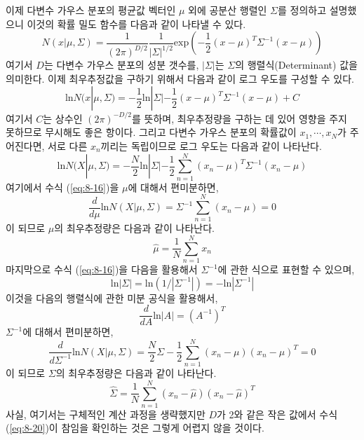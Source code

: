 \documentclass[a4paper]{oblivoir}
\begin{document}
이제 다변수 가우스 분포의 평균값 벡터인 $ {\mu}$ 외에 공분산 행렬인 ${\Sigma}$를 정의하고 설명했으니 이것의 확률 밀도 함수를 다음과 같이 나타낼 수 있다. 
\begin{equation}
N( {x}| {\mu},  {\Sigma}) = \frac{1}{(2 \pi)^{D/2}} \frac{1}{| {\Sigma}|^{1/2}} \textrm{exp}(-\frac{1}{2} ( {x}- {\mu})^{T}  {\Sigma}^{-1} ( {x}- {\mu})) \label{eq:8-14} 
\end{equation}
여기서 $D$는 다변수 가우스 분포의 성분 갯수를, $| {\Sigma}|$는 $ {\Sigma}$의 행렬식(Determinant) 값을 의미한다. 이제 최우추정값을 구하기 위해서 다음과 같이 로그 우도를 구성할 수 있다. 
\begin{equation}
\textrm{ln} N( {x}| {\mu},  {\Sigma}) = -\frac{1}{2} \textrm{ln}| {\Sigma}| -\frac{1}{2} ( {x}- {\mu})^{T}  {\Sigma}^{-1} ( {x}- {\mu}) +  {C} \label{eq:8-15} 
\end{equation}
여기서 $ {C}$는 상수인 $(2 \pi)^{-D/2}$를 뜻하며, 최우추정량을 구하는 데 있어 영향을 주지 못하므로 무시해도 좋은 항이다. 그리고 다변수 가우스 분포의 확률값이 $ {x}_1,\cdots, {x}_N$가 주어진다면, 서로 다른 $ {x}_n$끼리는 독립이므로 로그 우도는 다음과 같이 나타난다. 
\begin{equation}
\textrm{ln} N( {X}| {\mu},  {\Sigma}) = -\frac{N}{2} \textrm{ln}| {\Sigma}| - \frac{1}{2} \sum_{n=1}^{N} ( {x}_n- {\mu})^{T}  {\Sigma}^{-1} ( {x}_n- {\mu}) \label{eq:8-16} 
\end{equation}
여기에서 수식 (\ref{eq:8-16})을 $ {\mu}$에 대해서 편미분하면, 
\begin{equation}
\frac{d}{d {\mu}} \textrm{ln} N( {X}| {\mu},  {\Sigma}) =  {\Sigma}^{-1} \sum_{n=1}^{N} ( {x}_n- {\mu}) = 0 \label{eq:8-17} 
\end{equation}
이 되므로 $ {\mu}$의 최우추정량은 다음과 같이 나타난다.
\begin{equation}
\hat{ {\mu}} = \frac{1}{N} \sum_{n=1}^{N}  {x}_{n} \label{eq:8-18} 
\end{equation}
마지막으로 수식 (\ref{eq:8-16})을 다음을 활용해서 ${\Sigma}^{-1}$에 관한 식으로 표현할 수 있으며,
\begin{equation}
\textrm{ln}|{\Sigma}| = \textrm{ln}(1/|{\Sigma}^{-1}|) = -\textrm{ln}|{\Sigma}^{-1}| \label{eq:8-18-1} 
\end{equation}
이것을 다음의 행렬식에 관한 미분 공식을 활용해서,
\begin{equation}
\frac{d}{dA} \textrm{ln}|A| = (A^{-1})^{T} \label{eq:8-18-2} 
\end{equation}
${\Sigma}^{-1}$에 대해서 편미분하면, 
\begin{equation}
\frac{d}{d {\Sigma}^{-1}} \textrm{ln} N( {X}| {\mu},  {\Sigma}) = \frac{N}{2}  {\Sigma} - \frac{1}{2} \sum_{n=1}^{N} ( {x}_n- {\mu})  ( {x}_n- {\mu})^{T} = 0 \label{eq:8-19} 
\end{equation}
이 되므로 ${\Sigma}$의 최우추정량은 다음과 같이 나타난다.
\begin{equation}
\hat{ {\Sigma}} = \frac{1}{N} \sum_{n=1}^{N} ( {x}_n-\hat{ {\mu}})  ( {x}_n-\hat{ {\mu}})^{T} \label{eq:8-20} 
\end{equation}
사실, 여기서는 구체적인 계산 과정을 생략했지만 $D$가 2와 같은 작은 값에서 수식 (\ref{eq:8-20})이 참임을 확인하는 것은 그렇게 어렵지 않을 것이다. \\
\end{document}
